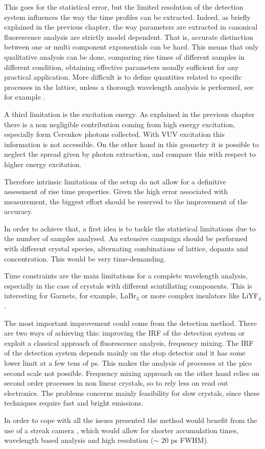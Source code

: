 This goes for the statistical error, but the limited resolution of the detection system influences the way the time profiles can be extracted. 
Indeed, as briefly explained in the previous chapter, the way parameters are extracted in canonical fluorescence analysis are strictly model dependent. That is, accurate distinction between one or multi component exponentials can be hard.
This means that only qualitative analysis can be done, comparing rise times of different samples in different condition, obtaining effective parameters usually sufficient for any practical application.
More difficult is to define quantities related to specific processes in the lattice, unless a thorough wavelength analysis is performed, see for example \cite{Belsky2013}.

A third limitation is the excitation energy. As explained in the previous chapter there is a non negligible contribution coming from high energy excitation, especially form Cerenkov photons collected. With VUV excitation this information is not accessible. On the other hand in this geometry it is possible to neglect the spread given by photon extraction, and compare this with respect to higher energy excitation. 

Therefore intrinsic limitations of the setup do not allow for a definitive assessment of rise time properties. Given the high error associated with measurement, the biggest effort should be reserved to the improvement of the accuracy.

In order to achieve that, a first idea is to tackle the statistical limitations due to the number of samples analysed. An extensive campaign should be performed with different crystal species, alternating combinations of lattice, dopants and concentration. This would be very time-demanding.

Time constraints are the main limitations for a complete wavelength analysis, especially in the case of crystals with different scintillating components. This is interesting for Garnets, for example, LaBr$_{3}$ or more complex insulators like LiYF$_{4}$.

The most important improvement could come from the detection method. There are two ways of achieving this: improving the IRF of the detection system or exploit a classical approach of fluorescence analysis, frequency mixing. The IRF of the detection system depends mainly on the stop detector and it has some lower limit at a few tens of ps. This makes the analysis of processes at the pico second scale not possible.
Frequency mixing approach on the other hand relies on second order processes in non linear crystals, so to rely less on read out electronics. The problems concerns mainly feasibility for slow crystals, since these techniques require fast and bright emissions.

In order to cope with all the issues presented the method would benefit from the use of a streak camera \cite{streak}, which would allow for shorter accumulation times, wavelength based analysis and high resolution ($\sim$ 20 ps FWHM). 